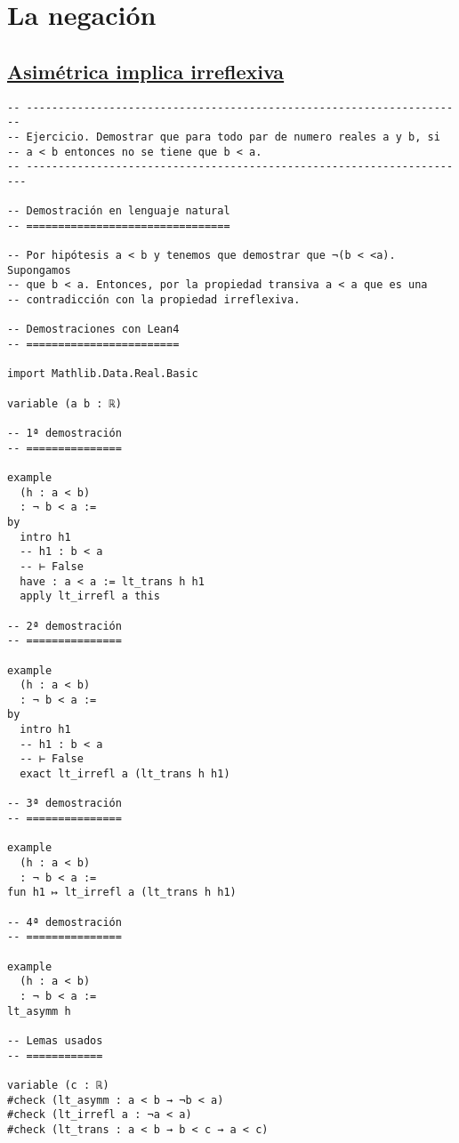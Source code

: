\section{La negación}
\label{sec:org6c52b90}

\subsection{\href{./src/Logica/Asimetrica\_implica\_irreflexiva.lean}{Asimétrica implica irreflexiva}}
\label{sec:org4b36dc8}
\begin{verbatim}
-- ---------------------------------------------------------------------
-- Ejercicio. Demostrar que para todo par de numero reales a y b, si
-- a < b entonces no se tiene que b < a.
-- ----------------------------------------------------------------------

-- Demostración en lenguaje natural
-- ================================

-- Por hipótesis a < b y tenemos que demostrar que ¬(b < <a). Supongamos
-- que b < a. Entonces, por la propiedad transiva a < a que es una
-- contradicción con la propiedad irreflexiva.

-- Demostraciones con Lean4
-- ========================

import Mathlib.Data.Real.Basic

variable (a b : ℝ)

-- 1ª demostración
-- ===============

example
  (h : a < b)
  : ¬ b < a :=
by
  intro h1
  -- h1 : b < a
  -- ⊢ False
  have : a < a := lt_trans h h1
  apply lt_irrefl a this

-- 2ª demostración
-- ===============

example
  (h : a < b)
  : ¬ b < a :=
by
  intro h1
  -- h1 : b < a
  -- ⊢ False
  exact lt_irrefl a (lt_trans h h1)

-- 3ª demostración
-- ===============

example
  (h : a < b)
  : ¬ b < a :=
fun h1 ↦ lt_irrefl a (lt_trans h h1)

-- 4ª demostración
-- ===============

example
  (h : a < b)
  : ¬ b < a :=
lt_asymm h

-- Lemas usados
-- ============

variable (c : ℝ)
#check (lt_asymm : a < b → ¬b < a)
#check (lt_irrefl a : ¬a < a)
#check (lt_trans : a < b → b < c → a < c)
\end{verbatim}

